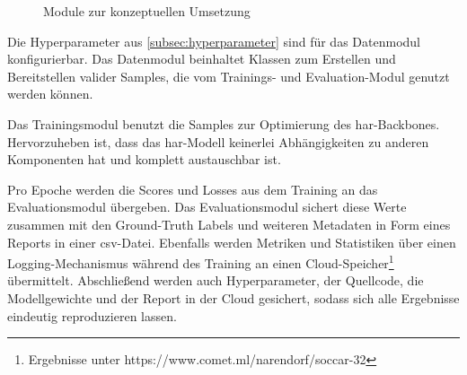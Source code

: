 \begin{figure}
    \centering
    \caption{Module zur konzeptuellen Umsetzung}
    \label{fig:modules}
\end{figure}

Die Hyperparameter aus \autoref{subsec:hyperparameter} sind für das Datenmodul konfigurierbar.
Das Datenmodul beinhaltet Klassen zum Erstellen und Bereitstellen valider Samples, die vom Trainings- und Evaluation-Modul genutzt werden können.

Das Trainingsmodul benutzt die Samples zur Optimierung des \gls{har}-Backbones.
Hervorzuheben ist, dass das \gls{har}-Modell keinerlei Abhängigkeiten zu anderen Komponenten hat und komplett austauschbar ist.

Pro Epoche werden die Scores und Losses aus dem Training an das Evaluationsmodul übergeben.
Das Evaluationsmodul sichert diese Werte zusammen mit den Ground-Truth Labels und weiteren Metadaten in Form eines Reports in einer \gls{csv}-Datei.
Ebenfalls werden Metriken und Statistiken über einen Logging-Mechanismus während des Training an einen Cloud-Speicher\footnote{Ergebnisse unter https://www.comet.ml/narendorf/soccar-32} übermittelt.
Abschließend werden auch Hyperparameter, der Quellcode, die Modellgewichte und der Report in der Cloud gesichert, sodass sich alle Ergebnisse eindeutig reproduzieren lassen.
